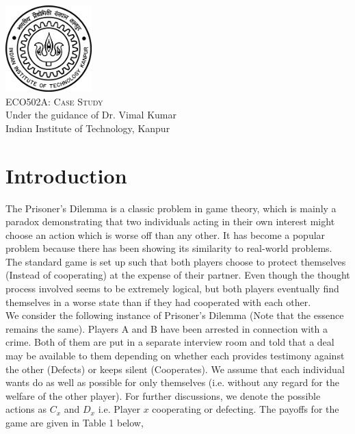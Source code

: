 \documentclass[a4paper]{article}
\begin{document}
\begin{titlepage}
\begin{center}
			\vfill
			\includegraphics[width=0.25\textwidth]{iitklogo.png}\\[0.1in]
            \vspace{3mm}
	        {\Large{\textsc{ECO502A: Case Study}}\\}
			\vspace{3mm}            
            \normalsize{Under the guidance of Dr. Vimal Kumar\\}
            \vspace{1mm}
            {Indian Institute of Technology, Kanpur}
	    \end{center}
	\end{titlepage}
	\restoregeometry

	\tableofcontents
	
	\pagebreak	
	
	\section{Introduction}
	
	The Prisoner's Dilemma \cite{prisoner} is a classic problem in game theory, which is mainly a paradox demonstrating that two individuals acting in their own interest might choose an action which is worse off than any other. It has become a popular problem because there has been showing its similarity to real-world problems. The standard game is set up such that both players choose to protect themselves (Instead of cooperating) at the expense of their partner. Even though the thought process involved seems to be extremely logical, but both players eventually find themselves in a worse state than if they had cooperated with each other.\\
	
	We consider the following instance of Prisoner's Dilemma (Note that the essence remains the same). Players A and B have been arrested in connection with a crime. Both of them are put in a separate interview room and told that a deal may be available to them depending on whether each provides testimony against the other (Defects) or keeps silent (Cooperates). We assume that each  individual wants do as well as possible for only themselves (i.e. without any regard for the welfare of the other player). For further discussions, we denote the possible actions as $C_{x}$ and $D_{x}$ i.e. Player $x$ cooperating or defecting. The payoffs for the game are given in Table 1 below,
\end{document}
